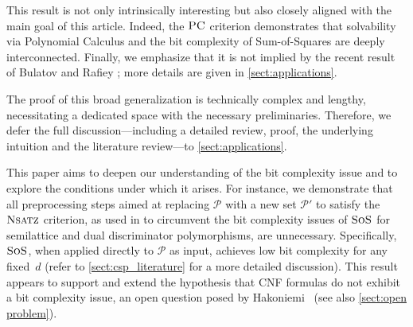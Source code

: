 \documentclass[11pt]{article}
\newcommand{\sos}{\text{\sc{SoS}}}
\newcommand{\PC}{\textsc{PC}}
\newcommand{\Nsatz}{\textsc{Nsatz}}
\newcommand{\1}{\textbf{1}}
\begin{document}
    {This result is not only intrinsically interesting but also closely aligned with the main goal of this article. Indeed, the $\PC$ criterion demonstrates that solvability via Polynomial Calculus and the bit complexity of Sum-of-Squares are deeply interconnected.
    }
    Finally, we emphasize that it is not implied by the recent result of Bulatov and Rafiey \cite{BulatovRSTOC22}; more details are given in \cref{sect:applications}.

The proof of this broad generalization is technically complex and lengthy, necessitating a dedicated space with the necessary preliminaries. Therefore, we defer the full discussion—including a detailed review, proof, the underlying intuition and the literature review—to \cref{sect:applications}.


    


This paper aims to deepen our understanding of the bit complexity issue and to explore the conditions under which it arises. For instance, we demonstrate that all preprocessing steps aimed at replacing \(\mathcal{P}\) with a new set \(\mathcal{P'}\) to satisfy the \(\Nsatz\) criterion, as used in \cite{BulatovRSTOC22,Mastrolilli21TALG, BharathiM22, BharathiM21} to circumvent the bit complexity issues of \(\sos\) for semilattice and dual discriminator polymorphisms, are unnecessary. Specifically, \(\sos\), when applied directly to \(\mathcal{P}\) as input, achieves low bit complexity for any fixed~\(d\) (refer to \cref{sect:csp_literature} for a more detailed discussion). This result appears to support and extend the hypothesis that CNF formulas do not exhibit a bit complexity issue, an open question posed by Hakoniemi~\cite{Hakoniemi21} (see also \cref{sect:open problem}).
\end{document}
